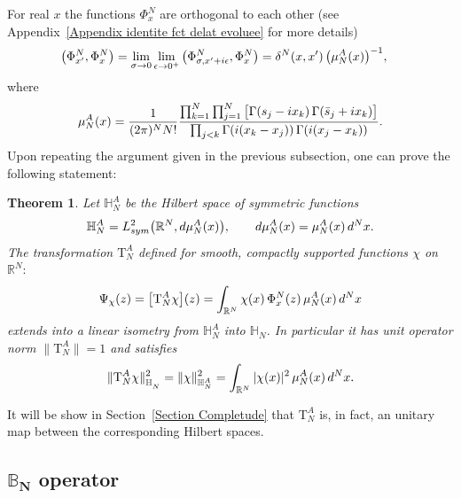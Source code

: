 \documentclass[11pt]{article}
\numberwithin{equation}{section}
\numberwithin{equation}{section}
\newtheorem{Theorem}{Theorem}[section]
\begin{document}
 For real $x$ the functions $\Phi^N_{ x}$ are orthogonal to
each other (see Appendix~\ref{Appendix identite fct delat evoluee} for more details)
\begin{align}\label{PhiAort}
 \big(\Phi^N_{ x'}, \Phi^N_{ x}\big) &=\lim_{\sigma\to0}\lim_{\epsilon\to 0^+}\big(\Phi^N_{\sigma, x'+{\rm i}\epsilon}, \Phi^N_x\big)
 =\delta^N( x,x')\, \big(\mu_N^A( x)\big)^{-1},
\end{align}
where
\begin{gather*}%
 \mu_N^A( x) = \frac1{(2\pi)^N N!}
 \frac{\prod_{k=1}^{N}\prod_{j=1}^N\big[\Gamma( s_j-{\rm i}x_k)\,\Gamma(\bar s_j+{\rm i}x_k)\big]}
 {\prod_{j< k} \Gamma({\rm i}(x_k-x_j))\,\Gamma({\rm i}(x_j-x_k))}.
\end{gather*}
Upon repeating the argument given in the previous subsection, one can prove the following statement:

\begin{Theorem}
Let $\mathbb H_N^A$ be the Hilbert space of symmetric functions
\begin{gather*}
\mathbb H_N^A =L^2_{\rm sym}\big(\mathbb R^N, {\rm d}\mu^A_N(x)\big),\qquad
{\rm d}\mu^A_N(x)=\mu^A_N(x)\, {\rm d}^Nx.
\end{gather*}
The transformation $\mathrm T_N^{A}$ defined for smooth, compactly supported functions $\chi$ on $\mathbb{R}^N{:}$
\begin{gather}\label{A-map}
\Psi_{\chi}(z)=\big[\mathrm T_N^A\chi\big](z)
=\int_{\mathbb R^{N}} \chi(x)\, \Phi^N_{{x}}( z)\, \mu_{N}^{A}( x)\, {\rm d}^{N} x
\end{gather}
extends into a linear isometry from $\mathbb H_N^A$ into $\mathbb H_N$. In particular it has unit operator norm $\big\|\mathrm T_{N}^{A}\big\|=1$
and satisfies
\begin{gather*}
\|\mathrm T_N^A\chi\|^2_{\mathbb H_N^{\phantom{A}}} = \| \chi\|^2_{\mathbb H_N^{A}} = \int_{\mathbb R^{N}} |\chi( x)|^2\, \mu_{N}^{A}( x)\, {\rm d}^{N} x.
\end{gather*}
\end{Theorem}

It will be show in Section~\ref{Section Completude} that $\mathrm T_N^A$ is, in fact, an unitary map between the corresponding Hilbert
spaces.

\subsection[BN operator]{$\boldsymbol{\mathbb B_N}$ operator}%
\end{document}
